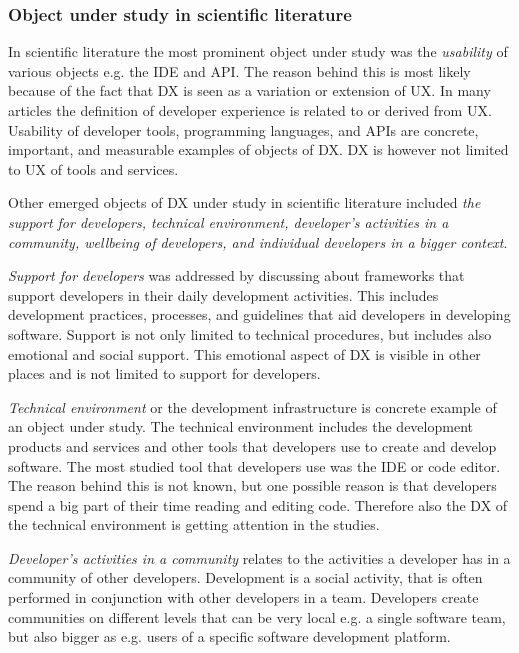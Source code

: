 \documentclass[english, 12pt, a4paper, sci, utf8, a-1b, online]{aaltothesis}
\begin{document}
\subsubsection{Object under study in scientific literature}

In scientific literature the most prominent object under study was the \textit{usability} of various objects e.g. the IDE and API. The reason behind this is most likely because of the fact that DX is seen as a variation or extension of UX. In many articles the definition of developer experience is related to or derived from UX. Usability of developer tools, programming languages, and APIs are concrete, important, and measurable examples of objects of DX. DX is however not limited to UX of tools and services.

Other emerged objects of DX under study in scientific literature included \textit{the support for developers, technical environment, developer's activities in a community, wellbeing of developers, and individual developers in a bigger context}.

\textit{Support for developers} was addressed by discussing about frameworks that support developers in their daily development activities. This includes development practices, processes, and guidelines that aid developers in developing software. Support is not only limited to technical procedures, but includes also emotional and social support. This emotional aspect of DX is visible in other places and is not limited to support for developers.

\textit{Technical environment} or the development infrastructure is concrete example of an object under study. The technical environment includes the development products and services and other tools that developers use to create and develop software. The most studied tool that developers use was the IDE or code editor. The reason behind this is not known, but one possible reason is that developers spend a big part of their time reading and editing code. Therefore also the DX of the technical environment is getting attention in the studies.

\textit{Developer's activities in a community} relates to the activities a developer has in a community of other developers. Development is a social activity, that is often performed in conjunction with other developers in a team. Developers create communities on different levels that can be very local e.g. a single software team, but also bigger as e.g. users of a specific software development platform.
\end{document}
